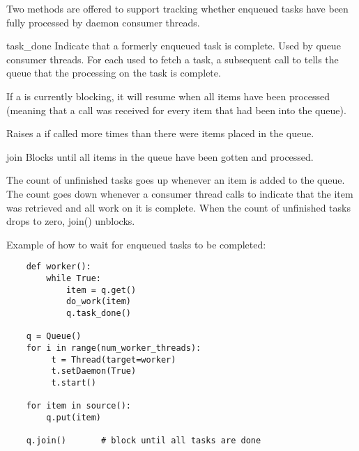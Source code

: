 Two methods are offered to support tracking whether enqueued tasks have
been fully processed by daemon consumer threads.

\begin{methoddesc}{task_done}{}
Indicate that a formerly enqueued task is complete.  Used by queue consumer
threads.  For each  used to fetch a task, a subsequent call to
 tells the queue that the processing on the task is complete.

If a  is currently blocking, it will resume when all items
have been processed (meaning that a  call was received
for every item that had been  into the queue).

Raises a  if called more times than there were items
placed in the queue.
\end{methoddesc}

\begin{methoddesc}{join}{}
Blocks until all items in the queue have been gotten and processed.

The count of unfinished tasks goes up whenever an item is added to the
queue. The count goes down whenever a consumer thread calls 
to indicate that the item was retrieved and all work on it is complete.
When the count of unfinished tasks drops to zero, join() unblocks.
\end{methoddesc}

Example of how to wait for enqueued tasks to be completed:

\begin{verbatim}
    def worker(): 
        while True: 
            item = q.get() 
            do_work(item) 
            q.task_done() 

    q = Queue() 
    for i in range(num_worker_threads): 
         t = Thread(target=worker)
         t.setDaemon(True)
         t.start() 

    for item in source():
        q.put(item) 

    q.join()       # block until all tasks are done
\end{verbatim}
